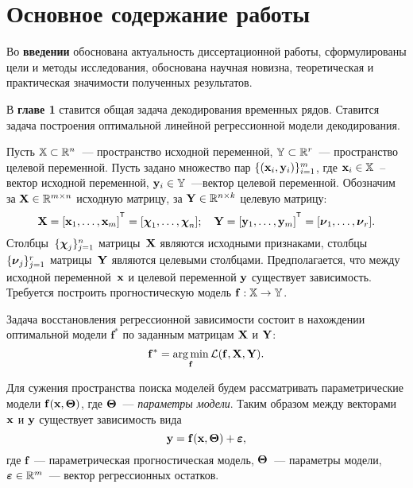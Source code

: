 \documentclass[11pt, a5paper]{dissert}
\begin{document}
\section*{Основное содержание работы}

Во \textbf{введении} обоснована актуальность диссертационной работы, сформулированы цели и методы исследования, обоснована научная новизна, теоретическая и практическая значимости полученных результатов.

В \textbf{главе 1} ставится общая задача декодирования временных рядов.
Ставится задача построения оптимальной линейной регрессионной модели декодирования.

Пусть $\mathbb{X} \subset \mathbb{R}^n$~--- пространство исходной переменной, $\mathbb{Y} \subset \mathbb{R}^r$~--- пространство целевой переменной.
Пусть задано множество пар $\{(\mathbf{x}_i, \mathbf{y}_i)\}_{i=1}^m$, где $\mathbf{x}_i \in \mathbb{X}$~-- вектор исходной переменной, $\mathbf{y}_i \in \mathbb{Y}$~---вектор целевой переменной.
Обозначим за $\mathbf{X} \in \mathbb{R}^{m \times n}$ исходную матрицу, за $\mathbf{Y} \in \mathbb{R}^{n \times k}$ целевую матрицу:
\begin{equation*}
	\bX = [\bx_1, \dots, \bx_m]^{\T} =  [\bchi_1, \dots, \bchi_n]; \quad \bY = [\by_1, \dots, \by_m]^{\T} =  [\bnu_1, \dots, \bnu_r].
\end{equation*}
Столбцы~$\{\boldsymbol{\chi}_j\}_{j=1}^n$ матрицы~$\mathbf{X}$ являются исходными признаками, столбцы~$\{\boldsymbol{\nu}_j\}_{j=1}^r$ матрицы~$\mathbf{Y}$ являются целевыми столбцами.
Предполагается, что между исходной переменной~$\mathbf{x}$ и целевой переменной $\mathbf{y}$ существует зависимость. Требуется построить прогностическую модель $\mathbf{f}: \mathbb{X} \rightarrow \mathbb{Y}$.

Задача восстановления регрессионной зависимости состоит в нахождении оптимальной модели $\mathbf{f}^*$ по заданным матрицам $\mathbf{X}$ и $\mathbf{Y}$:
\begin{equation}
	\mathbf{f}^* = \mathop{\arg \min}\limits_\mathbf{f} \mathcal{L}(\mathbf{f}, \mathbf{X}, \mathbf{Y}).
	\label{ch1:eq:loss_min}
\end{equation}

Для сужения пространства поиска моделей будем рассматривать параметрические модели $\mathbf{f}(\mathbf{x}, \boldsymbol{\Theta})$, где $\boldsymbol{\Theta}$~--- \textit{параметры модели}. 
Таким образом между векторами $\mathbf{x}$ и $\mathbf{y}$ существует зависимость вида
\begin{equation}
	\mathbf{y} = \mathbf{f}(\mathbf{x}, \boldsymbol{\Theta}) + \boldsymbol{\varepsilon},
	\label{ch1:eq:reg_model}
\end{equation}
где $\mathbf{f}$~--- параметрическая прогностическая модель, $\boldsymbol{\Theta}$~--- параметры модели, $\boldsymbol{\varepsilon} \in \mathbb{R}^{m}$~--- вектор регрессионных остатков. 
\end{document}
